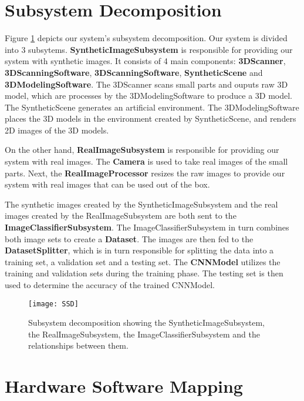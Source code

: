 \section{Subsystem Decomposition}\label{sec:subsystem_decomposition}

Figure \ref{fig:SSD} depicts our system's subsystem decomposition. Our system is divided into 3 subsytems. \textbf{SyntheticImageSubsystem} is responsible for providing our system with synthetic images. It consists of 4 main components: \textbf{3DScanner}, \textbf{3DScanningSoftware}, \textbf{3DScanningSoftware}, \textbf{SyntheticScene} and \textbf{3DModelingSoftware}. The 3DScanner scans small parts and ouputs raw 3D model, which are processes by the 3DModelingSoftware to produce a 3D model. The SyntheticScene generates an artificial environment. The 3DModelingSoftware places the 3D models in the environment created by SyntheticScene, and renders 2D images of the 3D models.

On the other hand, \textbf{RealImageSubsystem} is responsible for providing our system with real images. The \textbf{Camera} is used to take real images of the small parts. Next, the \textbf{RealImageProcessor} resizes the raw images to provide our system with real images that can be used out of the box.

The synthetic images created by the SyntheticImageSubsystem and the real images created by the RealImageSubsystem are both sent to the \textbf{ImageClassifierSubsystem}. The ImageClassifierSubsystem in turn combines both image sets to create a \textbf{Dataset}. The images are then fed to the \textbf{DatasetSplitter}, which is in turn responsible for splitting the data into a training set, a validation set and a testing set. The \textbf{CNNModel} utilizes the training and validation sets during the training phase. The testing set is then used to determine the accuracy of the trained CNNModel.

\begin{figure}[H]
\centering
  \texttt{[image: SSD]}
\caption{Subsystem decomposition showing the SyntheticImageSubsystem, the RealImageSubsystem, the ImageClassifierSubsystem and the relationships between them.}
\label{fig:SSD}
\end{figure}


\section{Hardware Software Mapping}\label{sec:hardware_software_mapping}


